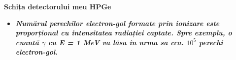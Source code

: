 \documentclass[10pt]{beamer}
\begin{document}
\begin{frame}{\textbf{Schița detectorului meu HPGe}}
\vspace{4.5cm}
\small

\begin{itemize}
    \item \makebox[0.5cm]{} \textit{\textbf{Numărul perechilor electron-gol formate prin ionizare este proporțional cu intensitatea radiației captate. Spre exemplu, o cuantă $\gamma$ cu E = 1 MeV va lăsa în urma sa cca. $10^5$ perechi electron-gol.}}
\end{itemize}



\end{frame}
\end{document}
